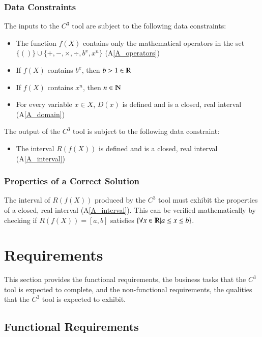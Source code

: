\documentclass[12pt]{article}
\newcommand{\aref}[1]{A\ref{#1}}
\newcommand{\prognameAbbrv}{$C^{3}$}
\begin{document}
\subsubsection{Data Constraints} \label{sec_DataConstraints}  
The inputs to the \prognameAbbrv{} tool are subject to the following data 
constraints:

\begin{itemize}
	\item The function $f(X)$ contains only the mathematical operators in 
	the set $\{()\} \cup \{+, -, \times, \div, b^x, x^n \}$ (\aref{A_operators})
	\item If $f(X)$ contains $b^x$, then $b > 1 \in \varmathbb{R}$
	\item If $f(X)$ contains $x^n$, then $n \in \varmathbb{N}$
	\item For every variable $x \in X$, $D(x)$ is defined and is a closed, real 
	interval (\aref{A_domain})
\end{itemize}

\noindent
The output of the \prognameAbbrv{} tool is subject to the following data 
constraint:

\begin{itemize}
	\item The interval $R(f(X))$ is defined and is a closed, real interval 
	(\aref{A_interval})
\end{itemize}

\subsubsection{Properties of a Correct Solution} 
\label{sec_CorrectSolution}

\noindent
The interval of $R(f(X))$ produced by the \prognameAbbrv{} tool must exhibit 
the properties of a closed, real interval (\aref{A_interval}). This can be 
verified mathematically by checking if $R(f(X)) = [a,b]$ satisfies $\{\forall x 
\in \varmathbb{R} | a \leq x \leq b\}$.


\section{Requirements}
\label{requirements}

This section provides the functional requirements, the business tasks that the
\prognameAbbrv{} tool is expected to complete, and the non-functional 
requirements, the qualities that the \prognameAbbrv{} tool is expected to 
exhibit.

\subsection{Functional Requirements}
\end{document}
